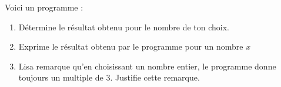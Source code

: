 \documentclass[a4paper,10pt]{report}
\begin{document}
\begin{ex}
Voici un programme :

\vspace{-1cm}
\noindent \begin{minipage}{9.5cm}
\begin{enumerate}[font=\color{exer3}]
\item Détermine le résultat obtenu pour le nombre de ton choix.
\item Exprime le résultat obtenu par le programme pour un nombre $x$
\item Lisa remarque qu'en choisissant un nombre entier, le programme donne toujours un multiple de $3$. Justifie cette remarque.
\end{enumerate}
\end{minipage}
\hspace{5mm}
\begin{minipage}{7cm}
\begin{scratch}[]
\end{scratch}
\end{minipage}
\end{ex}
\end{document}
